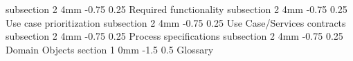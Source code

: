 \documentclass[12pt]{article}
\makeatletter
\renewcommand{\section}{\@startsection
   {section}%
   {1}%
   {0mm}%
   {-1.5\baselineskip}%
   {0.5\baselineskip}%
   {\sffamily\bfseries\upshape\normalsize}}%
\renewcommand{\subsection}{\@startsection
   {subsection}%
   {2}%
   {4mm}%
   {-0.75\baselineskip}%
   {0.25\baselineskip}%
   {\rmfamily\normalfont\scshape\normalsize}}%
\makeatother
\begin{document}
                    \subsection{Required functionality}
                    \subsection{Use case prioritization}
                    \subsection{Use Case/Services contracts}
                    \subsection{Process specifications}
                    \subsection{Domain Objects}
               \section{Glossary}
             
\end{document}
